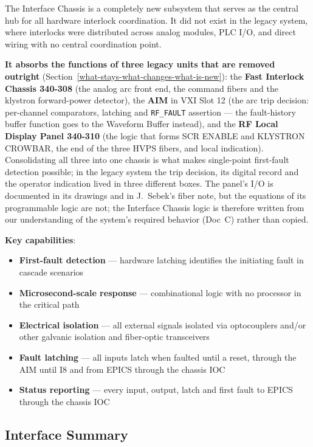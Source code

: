 The Interface Chassis is a completely new subsystem that serves as the central hub for all hardware interlock coordination. It did not exist in the legacy system, where interlocks were distributed across analog modules, PLC I/O, and direct wiring with no central coordination point.

\textbf{It absorbs the functions of three legacy units that are removed outright} (Section~\ref{what-stays-what-changes-what-is-new}): the \textbf{Fast Interlock Chassis 340-308} (the analog arc front end, the command fibers and the klystron forward-power detector), the \textbf{AIM} in VXI Slot 12 (the arc trip decision: per-channel comparators, latching and \texttt{RF\_FAULT} assertion --- the fault-history buffer function goes to the Waveform Buffer instead), and the \textbf{RF Local Display Panel 340-310} (the logic that forms SCR ENABLE and KLYSTRON CROWBAR, the end of the three HVPS fibers, and local indication). Consolidating all three into one chassis is what makes single-point first-fault detection possible; in the legacy system the trip decision, its digital record and the operator indication lived in three different boxes. The panel's I/O is documented in its drawings and in J.~Sebek's fiber note, but the equations of its programmable logic are not; the Interface Chassis logic is therefore written from our understanding of the system's required behavior (Doc~C) rather than copied.

\textbf{Key capabilities}:

\begin{itemize}
\tightlist
\item
  \textbf{First-fault detection} --- hardware latching identifies the initiating fault in cascade scenarios
\item
  \textbf{Microsecond-scale response} --- combinational logic with no processor in the critical path
\item
  \textbf{Electrical isolation} --- all external signals isolated via optocouplers and/or other galvanic isolation and fiber-optic transceivers
\item
  \textbf{Fault latching} --- all inputs latch when faulted until a reset, through the AIM until I8 and from EPICS through the chassis IOC
\item
  \textbf{Status reporting} --- every input, output, latch and first fault to EPICS through the chassis IOC
\end{itemize}

\subsection{Interface Summary}\label{interface-summary}

